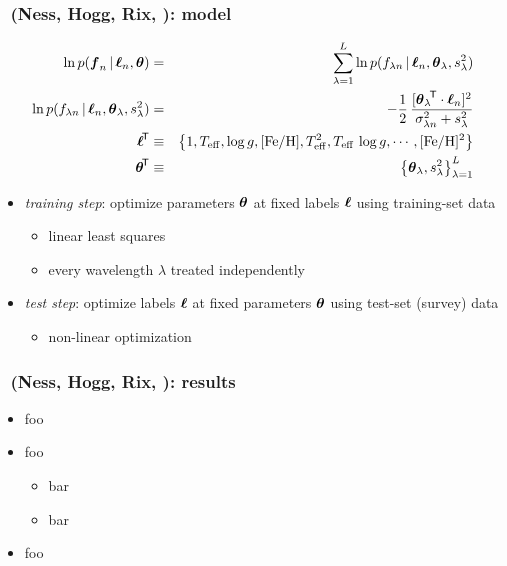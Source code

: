 \documentclass[pdftex]{beamer}
\newcommand{\credits}{{\footnotesize (Ness, Hogg, Rix, \etal)}}
\newcommand{\teff}{T_{\mathrm{eff}}}
\newcommand{\logg}{\log g}
\newcommand{\feh}{[\mathrm{Fe / H}]}
\begin{document}
\begin{frame}
  \frametitle{\tc\ \credits: model}
  \begin{eqnarray}
    \ln p(\fluxes_n\given\labels_n,\pars) &=& \sum_{\lambda=1}^L \ln p(\flux_{\lambda n}\given\labels_n,\pars_\lambda,s^2_\lambda)
    \nonumber \\
    \ln p(\flux_{\lambda n}\given\labels_n,\pars_\lambda,s^2_\lambda) &=& -\frac{1}{2}\,\frac{[\transpose{\pars_\lambda}\cdot\labels_n]^2}{\sigma^2_{\lambda n} + s^2_\lambda}
    \nonumber \\
    \transpose{\labels} &\equiv& \left\{1, \teff, \logg, \feh, \teff^2, \teff\,\logg, \cdots, \feh^2\right\}
    \nonumber \\
    \transpose{\pars} &\equiv& \left\{\pars_\lambda, s^2_\lambda\right\}_{\lambda=1}^L
    \nonumber
  \end{eqnarray}
  \begin{itemize}
  \item \emph{training step}: optimize parameters $\boldsymbol{\theta}$ at fixed labels
    $\boldsymbol{\ell}$ using training-set data
    \begin{itemize}
    \item linear least squares
    \item every wavelength $\lambda$ treated independently
    \end{itemize}
  \item \emph{test step}: optimize labels $\boldsymbol{\ell}$ at fixed
    parameters $\boldsymbol{\theta}$ using test-set (survey) data
    \begin{itemize}
    \item non-linear optimization
    \end{itemize}
  \end{itemize}
\end{frame}


\begin{frame}
  \frametitle{\tc\ \credits: results}
  \begin{itemize}
  \item foo
  \item foo
    \begin{itemize}
    \item bar
    \item bar
    \end{itemize}
  \item foo
  \end{itemize}
\end{frame}
\end{document}
